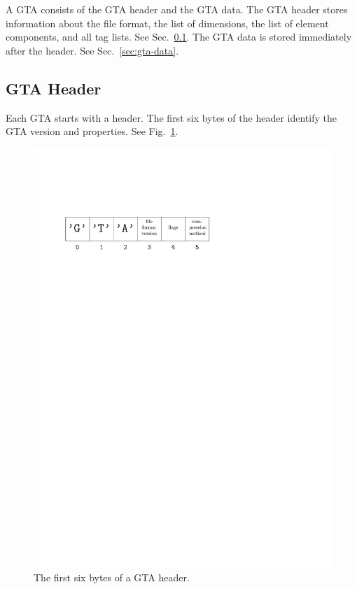 \documentclass[a4paper,11pt]{article}
\begin{document}
A GTA consists of the GTA header and the GTA data. The GTA header stores
information about the file format, the list of dimensions, the list of element
components, and all tag lists. See Sec.~\ref{sec:gta-header}.
The GTA data is stored immediately after the header. See Sec.~\ref{sec:gta-data}.


\subsection{GTA Header}
\label{sec:gta-header}

Each GTA starts with a header. The first six bytes of the header identify the
GTA version and properties. See Fig.~\ref{fig:gta-header}.

\begin{figure}
\begin{center}
\includegraphics[width=\textwidth]{gta-header.pdf}
\end{center}
\caption{The first six bytes of a GTA header.}
\label{fig:gta-header}
\end{figure}
\end{document}
